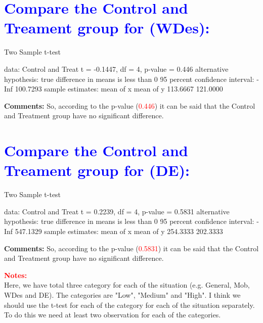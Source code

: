 \documentclass{article}
\begin{document}
\section*{\textcolor{blue}{Compare the Control and Treament group for (WDes):}}
\begin{Schunk}
\begin{Soutput}
	Two Sample t-test

data:  Control and Treat
t = -0.1447, df = 4, p-value = 0.446
alternative hypothesis: true difference in means is less than 0
95 percent confidence interval:
     -Inf 100.7293
sample estimates:
mean of x mean of y 
 113.6667  121.0000 
\end{Soutput}
\end{Schunk}
\textbf{Comments:} So, according to the p-value (\textcolor{red}{0.446}) it can be said that the Control and Treatment group have no significant difference.


\section*{\textcolor{blue}{Compare the Control and Treament group for (DE):}}
\begin{Schunk}
\begin{Soutput}
	Two Sample t-test

data:  Control and Treat
t = 0.2239, df = 4, p-value = 0.5831
alternative hypothesis: true difference in means is less than 0
95 percent confidence interval:
     -Inf 547.1329
sample estimates:
mean of x mean of y 
 254.3333  202.3333 
\end{Soutput}
\end{Schunk}
\textbf{Comments:} So, according to the p-value (\textcolor{red}{0.5831}) it can be said that the Control and Treatment group have no significant difference.



\bigskip




\textbf{\textcolor{red}{Notes:}}\\

Here, we have total three category for each of the situation (e.g. General, Mob, WDes and DE). The categories are "Low", "Medium" and "High". I think we should use the t-test for each of the category for each of the situation separately. To do this we need at least two observation for each of the categories.
 
\end{document}
